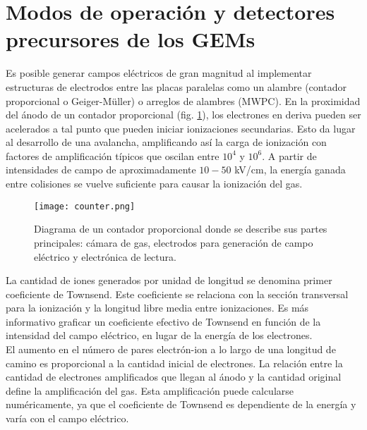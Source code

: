 \documentclass{article}
\begin{document}
\section{Modos de operación y detectores precursores de los GEMs}

\noindent Es posible generar campos eléctricos de gran magnitud al implementar estructuras de electrodos entre las placas paralelas como un alambre (contador proporcional o Geiger-Müller) o arreglos de alambres (MWPC). En la proximidad del ánodo de un contador proporcional (fig. \ref{fig:counter}), los electrones en deriva pueden ser acelerados a tal punto que pueden iniciar ionizaciones secundarias. Esto da lugar al desarrollo de una avalancha, amplificando así la carga de ionización con factores de amplificación típicos que oscilan entre \(10^4\) y \(10^6\). A partir de intensidades de campo de aproximadamente \(10-50\) kV/cm, la energía ganada entre colisiones se vuelve suficiente para causar la ionización del gas.\\

\begin{figure}[H]
    \centering
    \texttt{[image: counter.png]}
    \caption{Diagrama de un contador proporcional donde se describe sus partes principales: cámara de gas, electrodos para generación de campo eléctrico y electrónica de lectura.}
    \label{fig:counter}
\end{figure}

\noindent La cantidad de iones generados por unidad de longitud se denomina primer coeficiente de Townsend. Este coeficiente se relaciona con la sección transversal para la ionización y la longitud libre media entre ionizaciones. Es más informativo graficar un coeficiente efectivo de Townsend en función de la intensidad del campo eléctrico, en lugar de la energía de los electrones.\\

\noindent El aumento en el número de pares electrón-ion a lo largo de una longitud de camino es proporcional a la cantidad inicial de electrones. La relación entre la cantidad de electrones amplificados que llegan al ánodo y la cantidad original define la amplificación del gas. Esta amplificación puede calcularse numéricamente, ya que el coeficiente de Townsend es dependiente de la energía y varía con el campo eléctrico.\\
\end{document}
